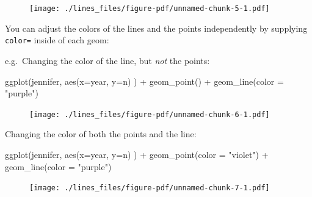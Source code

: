 \documentclass[
  letterpaper,
  DIV=11,
  numbers=noendperiod]{scrreprt}
\newenvironment{Shaded}{\begin{snugshade}}{\end{snugshade}}
\newcommand{\AttributeTok}[1]{\textcolor[rgb]{0.40,0.45,0.13}{#1}}
\newcommand{\FunctionTok}[1]{\textcolor[rgb]{0.28,0.35,0.67}{#1}}
\newcommand{\NormalTok}[1]{\textcolor[rgb]{0.00,0.23,0.31}{#1}}
\newcommand{\SpecialCharTok}[1]{\textcolor[rgb]{0.37,0.37,0.37}{#1}}
\newcommand{\StringTok}[1]{\textcolor[rgb]{0.13,0.47,0.30}{#1}}
\begin{document}
\begin{figure}[H]

{\centering \texttt{[image: ./lines\_files/figure-pdf/unnamed-chunk-5-1.pdf]}

}

\end{figure}

You can adjust the colors of the lines and the points independently by
supplying \texttt{color=} inside of each geom:

e.g.~Changing the color of the line, but \emph{not} the points:

\begin{Shaded}
\begin{Highlighting}[]
\FunctionTok{ggplot}\NormalTok{(jennifer, }\FunctionTok{aes}\NormalTok{(}\AttributeTok{x=}\NormalTok{year, }\AttributeTok{y=}\NormalTok{n) ) }\SpecialCharTok{+} 
  \FunctionTok{geom\_point}\NormalTok{() }\SpecialCharTok{+}
  \FunctionTok{geom\_line}\NormalTok{(}\AttributeTok{color =} \StringTok{"purple"}\NormalTok{) }
\end{Highlighting}
\end{Shaded}

\begin{figure}[H]

{\centering \texttt{[image: ./lines\_files/figure-pdf/unnamed-chunk-6-1.pdf]}

}

\end{figure}

Changing the color of both the points and the line:

\begin{Shaded}
\begin{Highlighting}[]
\FunctionTok{ggplot}\NormalTok{(jennifer, }\FunctionTok{aes}\NormalTok{(}\AttributeTok{x=}\NormalTok{year, }\AttributeTok{y=}\NormalTok{n) ) }\SpecialCharTok{+} 
  \FunctionTok{geom\_point}\NormalTok{(}\AttributeTok{color =} \StringTok{"violet"}\NormalTok{) }\SpecialCharTok{+}
  \FunctionTok{geom\_line}\NormalTok{(}\AttributeTok{color =} \StringTok{"purple"}\NormalTok{) }
\end{Highlighting}
\end{Shaded}

\begin{figure}[H]

{\centering \texttt{[image: ./lines\_files/figure-pdf/unnamed-chunk-7-1.pdf]}

}

\end{figure}
\end{document}
